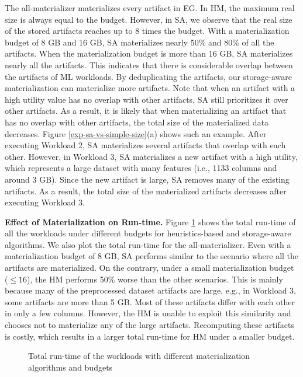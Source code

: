 The all-materializer materializes every artifact in EG.
In HM, the maximum real size is always equal to the budget.
However, in SA, we observe that the real size of the stored artifacts reaches up to 8 times the budget.
With a materialization budget of 8 GB and 16 GB, SA materializes nearly 50\% and 80\% of all the artifacts.
When the materialization budget is more than 16 GB, SA materializes nearly all the artifacts.
This indicates that there is considerable overlap between the artifacts of ML workloads.
By deduplicating the artifacts, our storage-aware materialization can materialize more artifacts.
Note that when an artifact with a high utility value has no overlap with other artifacts, SA still prioritizes it over other artifacts.
As a result, it is likely that when materializing an artifact that has no overlap with other artifacts, the total size of the materialized data decreases.
Figure \ref{exp-sa-vs-simple-size}(a) shows such an example.
After executing Workload 2, SA materializes several artifacts that overlap with each other.
However, in Workload 3, SA materializes a new artifact with a high utility, which represents a large dataset with many features (i.e., 1133 columns and around 3 GB).
Since the new artifact is large, SA removes many of the existing artifacts.
As a result, the total size of the materialized artifacts decreases after executing Workload 3.

\textbf{Effect of Materialization on Run-time.}
Figure \ref{run-time-vs-mat} shows the total run-time of all the workloads under different budgets for heuristics-based and storage-aware algorithms.
We also plot the total run-time for the all-materializer.
Even with a materialization budget of 8 GB, SA performs similar to the scenario where all the artifacts are materialized.
On the contrary, under a small materialization budget ($\leq 16$), the HM performs 50\% worse than the other scenarios.
This is mainly because many of the preprocessed dataset artifacts are large, e.g., in Workload 3, some artifacts are more than 5 GB.
Most of these artifacts differ with each other in only a few columns.
However, the HM is unable to exploit this similarity and chooses not to materialize any of the large artifacts.
Recomputing these artifacts is costly, which results in a larger total run-time for HM under a smaller budget.
\begin{figure}[h]
\centering
 \resizebox{0.7\columnwidth}{!}{%
%
}
\caption{Total run-time of the workloads with different materialization algorithms and budgets}
\label{run-time-vs-mat}
\end{figure}

